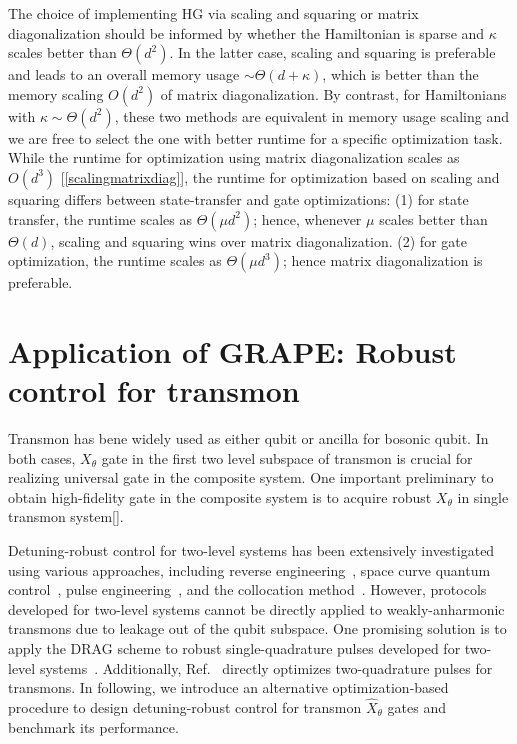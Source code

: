 \documentclass[12pt]{article}
\begin{document}
The choice of implementing HG via scaling and squaring or matrix diagonalization should be informed by whether the Hamiltonian is sparse and $\kappa$ scales better than $\Theta(d^2)$. In the latter case, scaling and squaring is preferable and leads to an overall memory usage $\sim \Theta(d+\kappa)$, which is better than the memory scaling $O(d^2)$ of matrix diagonalization. By contrast, for Hamiltonians with $\kappa\sim \Theta(d^2)$, these two methods are equivalent in memory usage scaling and we are free to select the one with better runtime for a specific optimization task. While the runtime for optimization using matrix diagonalization scales as $O(d^3)$ [\ref{scalingmatrixdiag}], the runtime for optimization based on scaling and squaring differs between state-transfer and gate optimizations: (1) for state transfer, the runtime scales as $\Theta(\mu d^2)$; hence, whenever $\mu$ scales better than $\Theta(d)$, scaling and squaring wins over matrix diagonalization. (2) for gate optimization, the runtime scales as $\Theta(\mu d^3)$; hence matrix diagonalization is preferable. 


\section{Application of GRAPE: Robust control for transmon}
Transmon has bene widely used as either qubit or ancilla for bosonic qubit. In both cases, $X_\theta$ gate in the first two level subspace of transmon is crucial for realizing universal gate in the composite system. One important preliminary to obtain high-fidelity gate in the composite system is to acquire robust $X_\theta$ in single transmon system[].

Detuning-robust control for two-level systems has been extensively investigated using various approaches, including reverse engineering~\cite{PhysRevLett.111.050404inverseengi,PhysRevLett.125.250403inverseengi}, space curve quantum control~\cite{barnes2022dynamicallyspacecurve}, pulse engineering~\cite{barnes2022dynamicallyspacecurve,wang2012compositepulse,PhysRevA.83.053420pulse,PhysRevA.86.022315pulse,tycko1983broadbandpulse,PhysRevA.107.023103pulse,ball2021softwarepulseengi,wimperis1994broadbandpulse,pasini2009optimizedinitialpulse}, and the collocation method~\cite{propson2022robustcollocation,Trowbridge2023}. However, protocols developed for two-level systems cannot be directly applied to weakly-anharmonic transmons due to leakage out of the qubit subspace. One promising solution is to apply the DRAG scheme to robust single-quadrature pulses developed for two-level systems~\cite{hai2023universalcompare}. 
Additionally, Ref.~\cite{qctrl} directly optimizes two-quadrature pulses for transmons.
In following, we introduce an alternative optimization-based procedure to design detuning-robust control for transmon $\hat{X}_{\theta}$ gates and benchmark its performance.
\end{document}
